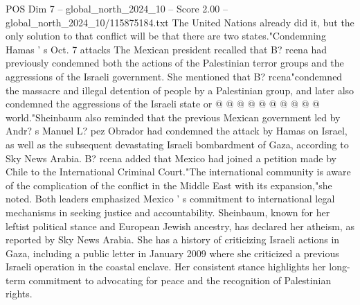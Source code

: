 \begin{textsample}{POS Dim 7 – global\_north\_2024\_10 – Score 2.00 – global\_north\_2024\_10/115875184.txt}
The United Nations already did it, but the only solution to that conflict will be that there are two states."Condemning Hamas ' s Oct. 7 attacks The Mexican president recalled that B? rcena had previously condemned both the actions of the Palestinian terror groups and the aggressions of the Israeli government.
She mentioned that B? rcena"condemned the massacre and illegal detention of people by a Palestinian group, and later also condemned the aggressions of the Israeli state or @ @ @ @ @ @ @ @ @ @ world."Sheinbaum also reminded that the previous Mexican government led by Andr? s Manuel L? pez Obrador had condemned the attack by Hamas on Israel, as well as the subsequent devastating Israeli bombardment of Gaza, according to Sky News Arabia.
B? rcena added that Mexico had joined a petition made by Chile to the International Criminal Court."The international community is aware of the complication of the conflict in the Middle East with its expansion,"she noted.
Both leaders emphasized Mexico ' s commitment to international legal mechanisms in seeking justice and accountability.
Sheinbaum, known for her leftist political stance and European Jewish ancestry, has declared her atheism, as reported by Sky News Arabia.
She has a history of criticizing Israeli actions in Gaza, including a public letter in January 2009 where she criticized a previous Israeli operation in the coastal enclave.
Her consistent stance highlights her long-term commitment to advocating for peace and the recognition of Palestinian rights.

\end{textsample}
